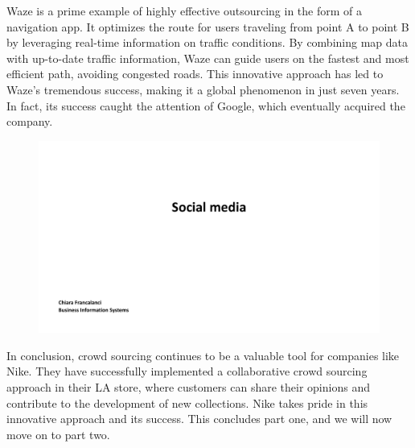 Waze is a prime example of highly effective outsourcing in the form of
a navigation app. It optimizes the route for users traveling from point
A to point B by leveraging real-time information on traffic conditions.
By combining map data with up-to-date traffic information, Waze can
guide users on the fastest and most efficient path, avoiding congested
roads. This innovative approach has led to Waze's tremendous success,
making it a global phenomenon in just seven years. In fact, its success
caught the attention of Google, which eventually acquired the company.

\begin{figure}[!h]
  \centering
  \includegraphics[page=10, trim = 1.5cm 5cm 3cm 4cm, clip, width=\imagewidth]{images/04 - Social_Media.pdf}
\end{figure}

In conclusion, crowd sourcing continues to be a valuable tool for
companies like Nike. They have successfully implemented a collaborative
crowd sourcing approach in their LA store, where customers can share
their opinions and contribute to the development of new collections.
Nike takes pride in this innovative approach and its success. This
concludes part one, and we will now move on to part two.
